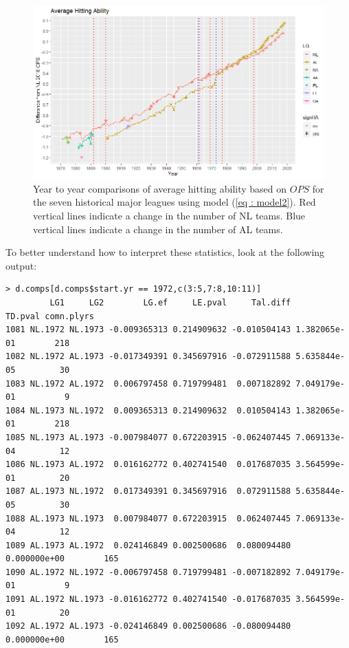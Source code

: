 \documentclass [52pt] {article}
\begin{document}
\begin{figure}[h!]
\centering
\includegraphics[scale = 0.7]{MLByr2yrHA_v2.png}
\caption{\label{fig : HAv2} Year to year comparisons of average hitting ability based on $OPS$ for the seven historical major leagues using model (\ref{eq : model2}).  Red vertical lines indicate a change in the number of NL teams.  Blue vertical lines indicate a change in the number of AL teams.}
\end{figure}
To better understand how to interpret these statistics, look at the following output:
\begin{verbatim}
> d.comps[d.comps$start.yr == 1972,c(3:5,7:8,10:11)]
         LG1     LG2        LG.ef     LE.pval     Tal.diff      TD.pval comn.plyrs
1081 NL.1972 NL.1973 -0.009365313 0.214909632 -0.010504143 1.382065e-01        218
1082 NL.1972 AL.1973 -0.017349391 0.345697916 -0.072911588 5.635844e-05         30
1083 NL.1972 AL.1972  0.006797458 0.719799481  0.007182892 7.049179e-01          9
1084 NL.1973 NL.1972  0.009365313 0.214909632  0.010504143 1.382065e-01        218
1085 NL.1973 AL.1973 -0.007984077 0.672203915 -0.062407445 7.069133e-04         12
1086 NL.1973 AL.1972  0.016162772 0.402741540  0.017687035 3.564599e-01         20
1087 AL.1973 NL.1972  0.017349391 0.345697916  0.072911588 5.635844e-05         30
1088 AL.1973 NL.1973  0.007984077 0.672203915  0.062407445 7.069133e-04         12
1089 AL.1973 AL.1972  0.024146849 0.002500686  0.080094480 0.000000e+00        165
1090 AL.1972 NL.1972 -0.006797458 0.719799481 -0.007182892 7.049179e-01          9
1091 AL.1972 NL.1973 -0.016162772 0.402741540 -0.017687035 3.564599e-01         20
1092 AL.1972 AL.1973 -0.024146849 0.002500686 -0.080094480 0.000000e+00        165
\end{verbatim}
\end{document}
